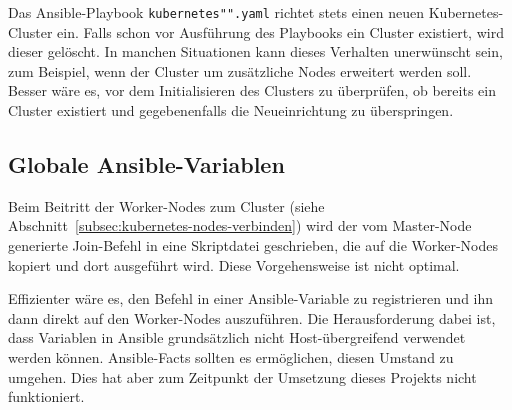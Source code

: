 Das Ansible-Playbook \texttt{kubernetes"".yaml} richtet stets einen neuen Kubernetes-Cluster ein.
Falls schon vor Ausführung des Playbooks ein Cluster existiert, wird dieser gelöscht.
In manchen Situationen kann dieses Verhalten unerwünscht sein, zum Beispiel, wenn der Cluster um zusätzliche Nodes erweitert werden soll.
Besser wäre es, vor dem Initialisieren des Clusters zu überprüfen, ob bereits ein Cluster existiert und gegebenenfalls die Neueinrichtung zu überspringen.

\subsection{Globale Ansible-Variablen}

Beim Beitritt der Worker-Nodes zum Cluster (siehe Abschnitt~\ref{subsec:kubernetes-nodes-verbinden}) wird der vom Master-Node generierte Join-Befehl in eine Skriptdatei geschrieben, die auf die Worker-Nodes kopiert und dort ausgeführt wird.
Diese Vorgehensweise ist nicht optimal.

Effizienter wäre es, den Befehl in einer Ansible-Variable zu registrieren und ihn dann direkt auf den Worker-Nodes auszuführen.
Die Herausforderung dabei ist, dass Variablen in Ansible grundsätzlich nicht Host-übergreifend verwendet werden können.
Ansible-Facts sollten es ermöglichen, diesen Umstand zu umgehen.
Dies hat aber zum Zeitpunkt der Umsetzung dieses Projekts nicht funktioniert.
